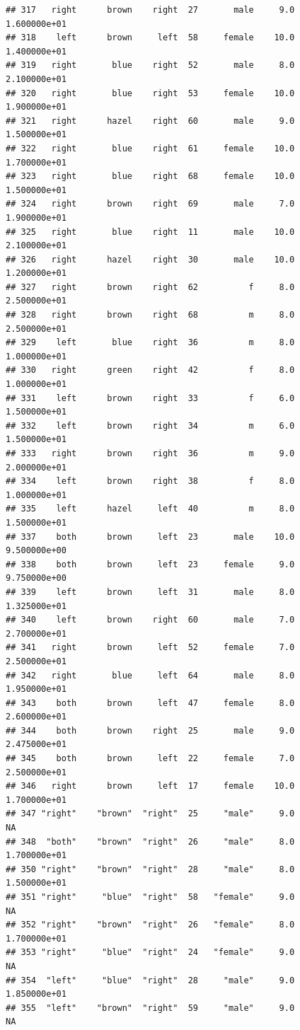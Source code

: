 \documentclass[]{article}
\begin{document}
\begin{verbatim}
## 317   right      brown    right  27       male     9.0  1.600000e+01
## 318    left      brown     left  58     female    10.0  1.400000e+01
## 319   right       blue    right  52       male     8.0  2.100000e+01
## 320   right       blue    right  53     female    10.0  1.900000e+01
## 321   right      hazel    right  60       male     9.0  1.500000e+01
## 322   right       blue    right  61     female    10.0  1.700000e+01
## 323   right       blue    right  68     female    10.0  1.500000e+01
## 324   right      brown    right  69       male     7.0  1.900000e+01
## 325   right       blue    right  11       male    10.0  2.100000e+01
## 326   right      hazel    right  30       male    10.0  1.200000e+01
## 327   right      brown    right  62          f     8.0  2.500000e+01
## 328   right      brown    right  68          m     8.0  2.500000e+01
## 329    left       blue    right  36          m     8.0  1.000000e+01
## 330   right      green    right  42          f     8.0  1.000000e+01
## 331    left      brown    right  33          f     6.0  1.500000e+01
## 332    left      brown    right  34          m     6.0  1.500000e+01
## 333   right      brown    right  36          m     9.0  2.000000e+01
## 334    left      brown    right  38          f     8.0  1.000000e+01
## 335    left      hazel     left  40          m     8.0  1.500000e+01
## 337    both      brown     left  23       male    10.0  9.500000e+00
## 338    both      brown     left  23     female     9.0  9.750000e+00
## 339    left      brown     left  31       male     8.0  1.325000e+01
## 340    left      brown    right  60       male     7.0  2.700000e+01
## 341   right      brown     left  52     female     7.0  2.500000e+01
## 342   right       blue     left  64       male     8.0  1.950000e+01
## 343    both      brown     left  47     female     8.0  2.600000e+01
## 344    both      brown    right  25       male     9.0  2.475000e+01
## 345    both      brown     left  22     female     7.0  2.500000e+01
## 346   right      brown     left  17     female    10.0  1.700000e+01
## 347 "right"    "brown"  "right"  25     "male"     9.0            NA
## 348  "both"    "brown"  "right"  26     "male"     8.0  1.700000e+01
## 350 "right"    "brown"  "right"  28     "male"     8.0  1.500000e+01
## 351 "right"     "blue"  "right"  58   "female"     9.0            NA
## 352 "right"    "brown"  "right"  26   "female"     8.0  1.700000e+01
## 353 "right"     "blue"  "right"  24   "female"     9.0            NA
## 354  "left"     "blue"  "right"  28     "male"     9.0  1.850000e+01
## 355  "left"    "brown"  "right"  59     "male"     9.0            NA

\end{verbatim}
\end{document}
